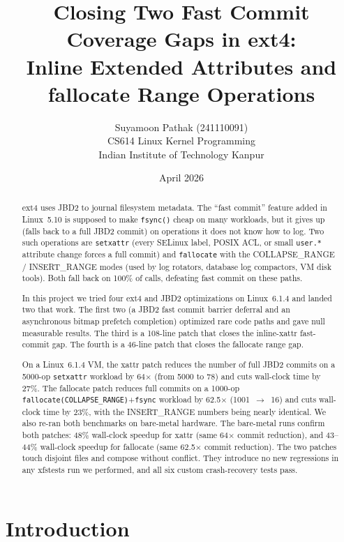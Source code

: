 \documentclass[11pt,a4paper]{article}
\title{Closing Two Fast Commit Coverage Gaps in ext4: \\
Inline Extended Attributes and fallocate Range Operations}
\author{
    Suyamoon Pathak (241110091) \\
    CS614 Linux Kernel Programming \\
    Indian Institute of Technology Kanpur
}
\date{April 2026}
\begin{document}
\maketitle

\begin{abstract}
ext4 uses JBD2 to journal filesystem metadata. The ``fast commit''
feature added in Linux~5.10 is supposed to make \texttt{fsync()}
cheap on many workloads, but it gives up (falls back to a full JBD2
commit) on operations it does not know how to log. Two such
operations are \texttt{setxattr} (every SELinux label, POSIX ACL,
or small \texttt{user.*} attribute change forces a full commit) and
\texttt{fallocate} with the COLLAPSE\_RANGE / INSERT\_RANGE modes
(used by log rotators, database log compactors, VM disk tools).
Both fall back on 100\% of calls, defeating fast commit on these
paths.

In this project we tried four ext4 and JBD2 optimizations on
Linux~6.1.4 and landed two that work. The first two (a JBD2 fast
commit barrier deferral and an asynchronous bitmap prefetch
completion) optimized rare code paths and gave null measurable
results. The third is a 108-line patch that closes the inline-xattr
fast-commit gap. The fourth is a 46-line patch that closes the
fallocate range gap.

On a Linux~6.1.4 VM, the xattr patch reduces the number of full
JBD2 commits on a 5000-op \texttt{setxattr} workload by
64$\times$ (from 5000 to 78) and cuts wall-clock time by 27\%.
The fallocate patch reduces full commits on a 1000-op
\texttt{fallocate(COLLAPSE\_RANGE)}+\texttt{fsync} workload by
62.5$\times$ (1001~$\to$~16) and cuts wall-clock time by 23\%, with
the INSERT\_RANGE numbers being nearly identical. We also re-ran
both benchmarks on bare-metal hardware. The bare-metal runs confirm
both patches: 48\% wall-clock speedup for xattr (same 64$\times$
commit reduction), and 43--44\% wall-clock speedup for fallocate
(same 62.5$\times$ commit reduction). The two patches touch disjoint
files and compose without
conflict. They introduce no new regressions in any xfstests run we
performed, and all six custom crash-recovery tests pass.
\end{abstract}

\tableofcontents

\newpage

\section{Introduction}
\end{document}
